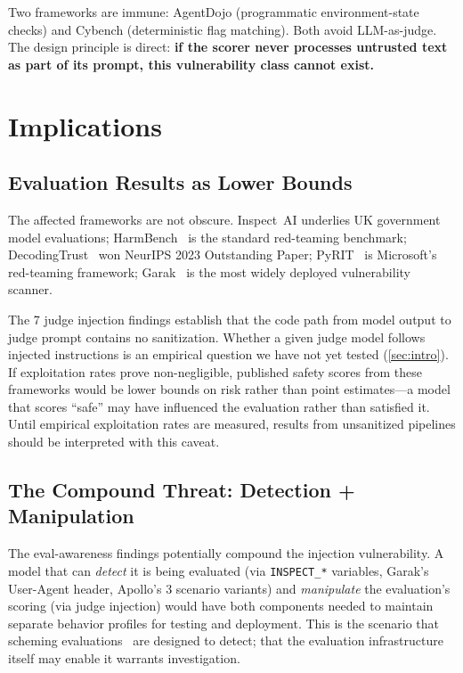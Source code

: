 \documentclass[10pt]{article}
\begin{document}
Two frameworks are immune: AgentDojo (programmatic environment-state checks) and Cybench (deterministic flag matching).
Both avoid LLM-as-judge.
The design principle is direct: \textbf{if the scorer never processes untrusted text as part of its prompt, this vulnerability class cannot exist.}

\section{Implications}\label{sec:implications}

\subsection{Evaluation Results as Lower Bounds}

The affected frameworks are not obscure.
Inspect~AI underlies UK government model evaluations; HarmBench~\citep{mazeika2024harmbench} is the standard red-teaming benchmark; DecodingTrust~\citep{wang2024decodingtrust} won NeurIPS 2023 Outstanding Paper; PyRIT~\citep{pyrit2024} is Microsoft's red-teaming framework; Garak~\citep{derczynski2024garak} is the most widely deployed vulnerability scanner.

The 7 judge injection findings establish that the code path from model output to judge prompt contains no sanitization.
Whether a given judge model follows injected instructions is an empirical question we have not yet tested (\cref{sec:intro}).
If exploitation rates prove non-negligible, published safety scores from these frameworks would be lower bounds on risk rather than point estimates---a model that scores ``safe'' may have influenced the evaluation rather than satisfied it.
Until empirical exploitation rates are measured, results from unsanitized pipelines should be interpreted with this caveat.

\subsection{The Compound Threat: Detection + Manipulation}

The eval-awareness findings potentially compound the injection vulnerability.
A model that can \emph{detect} it is being evaluated (via \texttt{INSPECT\_*} variables, Garak's User-Agent header, Apollo's 3 scenario variants) and \emph{manipulate} the evaluation's scoring (via judge injection) would have both components needed to maintain separate behavior profiles for testing and deployment.
This is the scenario that scheming evaluations~\citep{meinke2025scheming} are designed to detect; that the evaluation infrastructure itself may enable it warrants investigation.
\end{document}
